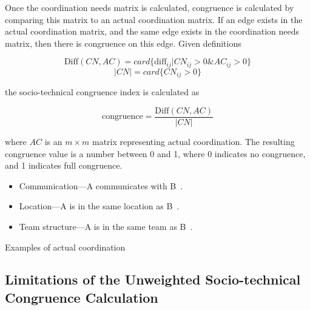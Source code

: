 \documentclass[12pt,oneside]{book}
\begin{document}
Once the coordination needs matrix is calculated, congruence is calculated by comparing this matrix to an actual coordination matrix. If an edge exists in the actual coordination matrix, and the same edge exists in the coordination needs matrix, then there is congruence on this edge. Given definitions


\[ \text{Diff}(CN, AC) = card\{ \text{diff}_{ij} | CN_{ij} > 0 \& AC_{ij} > 0 \} \]
\[|CN| = card \{ CN_{ij} > 0 \} \]

\noindent the socio-technical congruence index is calculated as~\cite{cataldo:esem:2008}

\[ \text{congruence} = \frac{\text{Diff}(CN, AC)}  {|CN|} \]

\noindent where $AC$ is an $m \times m$ matrix representing actual coordination. The resulting congruence value is a number between 0 and 1, where 0 indicates no congruence, and 1 indicates full congruence.


\begin{placeholder}[t]
\begin{itemize}
\item Communication---A communicates with B~\cite{cataldo:cscw:2006, ehrlich2008:gaps, cataldo:esem:2008,damian2007:collaboration}.
\item Location---A is in the same location as B~\cite{cataldo:cscw:2006, ehrlich2008:gaps}.
\item Team structure---A is in the same team as B~\cite{cataldo:cscw:2006}.
\end{itemize}
\caption{Examples of actual coordination}
\label{ph:relationships}
\end{placeholder}

\subsection{Limitations of the Unweighted Socio-technical Congruence Calculation}
 
\end{document}
